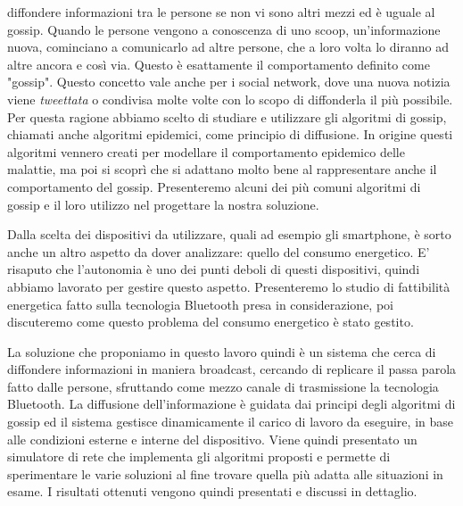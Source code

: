 diffondere informazioni tra le persone se non vi sono altri mezzi ed è uguale al gossip. Quando le persone vengono a conoscenza di uno scoop, un'informazione nuova, cominciano a comunicarlo ad altre persone, che a loro volta lo diranno ad altre ancora e così via. Questo è esattamente il comportamento definito come "gossip". Questo concetto vale anche per i social network, dove una nuova notizia viene \textit{tweettata} o condivisa molte volte con lo scopo di diffonderla il più possibile. Per questa ragione abbiamo scelto di studiare e utilizzare gli algoritmi di gossip, chiamati anche algoritmi epidemici, come principio di diffusione. In origine questi algoritmi vennero creati per modellare il comportamento epidemico delle malattie, ma poi si scoprì che si adattano molto bene al rappresentare anche il comportamento del gossip. Presenteremo alcuni dei più comuni algoritmi di gossip e il loro utilizzo nel progettare la nostra soluzione. 

Dalla scelta dei dispositivi da utilizzare, quali ad esempio gli smartphone, è sorto anche un altro aspetto da dover analizzare: quello del consumo energetico. E' risaputo che l'autonomia è uno dei punti deboli di questi dispositivi, quindi abbiamo lavorato per gestire questo aspetto. Presenteremo lo studio di fattibilità energetica fatto sulla tecnologia Bluetooth presa in considerazione, poi discuteremo come questo problema del consumo energetico è stato gestito.

La soluzione che proponiamo in questo lavoro quindi è un sistema che cerca di diffondere informazioni in maniera broadcast, cercando di replicare il passa parola fatto dalle persone, sfruttando come mezzo canale di trasmissione la tecnologia Bluetooth. La diffusione dell'informazione è guidata dai principi degli algoritmi di gossip ed il sistema gestisce dinamicamente il carico di lavoro da eseguire, in base alle condizioni esterne e interne del dispositivo. Viene quindi presentato un simulatore di rete che implementa gli algoritmi proposti e permette di sperimentare le varie soluzioni al fine trovare quella più adatta alle situazioni in esame. I risultati ottenuti vengono quindi presentati e discussi in dettaglio.

